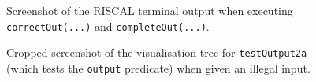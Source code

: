\documentclass{article}
\begin{document}
\begin{figure}[htbp]
  \noindent{}

  \caption{Screenshot of the RISCAL terminal output when executing \texttt{correctOut(...)} and \texttt{completeOut(...)}. \label{fig:correct}}
\end{figure}

\begin{figure}[htbp]
  \noindent{}

  \caption{Cropped screenshot of the visualisation tree for \texttt{testOutput2a} (which tests the \texttt{output} predicate) when given an illegal input.  \label{fig:tree}}
\end{figure}
\end{document}
